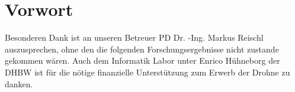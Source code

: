 \chapter{Vorwort}

Besonderen Dank ist an unseren Betreuer PD Dr. -Ing. Markus Reischl auszusprechen, ohne den die folgenden Forschungsergebnisse nicht zustande gekommen wären. Auch dem Informatik Labor unter Enrico Hühneborg der DHBW ist für die nötige finanzielle Unterstützung zum Erwerb der Drohne zu danken.